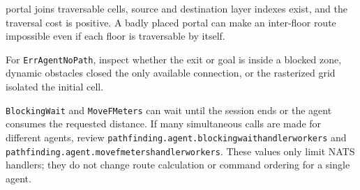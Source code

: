 \documentclass[12pt,a4paper]{report}
\begin{document}
\begin{description}
portal joins traversable cells, source and destination layer indexes exist, and
the traversal cost is positive. A badly placed portal can make an inter-floor
route impossible even if each floor is traversable by itself.
\item[Route not found.] For \texttt{ErrAgentNoPath}, inspect whether the exit or
goal is inside a blocked zone, dynamic obstacles closed the only available
connection, or the rasterized grid isolated the initial cell.
\item[Blocking calls.] \texttt{BlockingWait} and \texttt{MoveFMeters} can wait
until the session ends or the agent consumes the requested distance. If many
simultaneous calls are made for different agents, review
\texttt{pathfinding.agent.blockingwaithandlerworkers} and
\texttt{pathfinding.agent.movefmetershandlerworkers}. These values only limit
NATS handlers; they do not change route calculation or command ordering for a
single agent.
\end{description}
\end{document}
